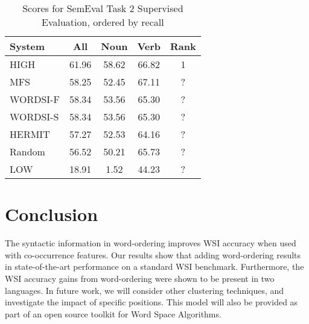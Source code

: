 \documentclass[11pt]{article}
\begin{document}
\begin{table}
  \center
  \small
  \begin{tabular} { | l | cccc |}
      \hline
      System & All & Noun & Verb & Rank \\
      \hline
      HIGH & 61.96 & 58.62 & 66.82 & 1 \\
      MFS & 58.25 & 52.45 & 67.11 & ? \\
      WORDSI-F & 58.34 & 53.56 & 65.30 & ? \\
      WORDSI-S & 58.34 & 53.56 & 65.30 & ? \\
      HERMIT & 57.27 & 52.53 & 64.16 & ? \\
      Random & 56.52 & 50.21 & 65.73 & ? \\
      LOW & 18.91 & 1.52 & 44.23 & ? \\
      \hline
  \end{tabular}
  \caption{Scores for SemEval Task 2 Supervised Evaluation, ordered by recall}
  \label{tab:supervised}
\end{table}

\section{Conclusion}

The syntactic information in word-ordering improves WSI accuracy when used with
co-occurrence features.  Our results show that adding word-ordering results in
state-of-the-art performance on a standard WSI benchmark.  Furthermore, the WSI
accuracy gains from word-ordering were shown to be present in two languages.
In future work, we will consider other clustering techniques, and investigate
the impact of specific positions.  This model will also be provided as part
of an open source toolkit for Word Space Algorithms.



\end{document}
